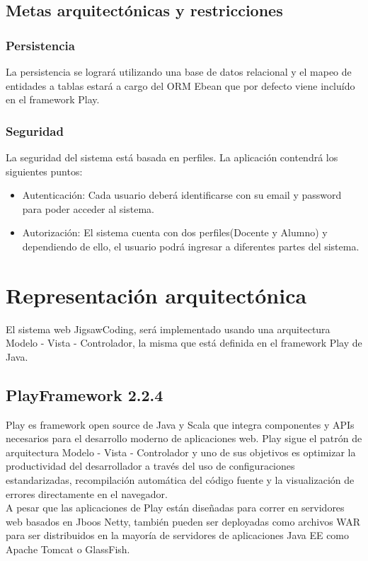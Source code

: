 \subsection{Metas arquitectónicas y restricciones}
\subsubsection{Persistencia}
La persistencia se logrará utilizando una base de datos relacional y el mapeo de entidades a tablas estará a cargo del ORM Ebean que por defecto viene incluído en el framework Play.

\subsubsection{Seguridad}
La seguridad del sistema está basada en perfiles. La aplicación contendrá los siguientes puntos:

\begin{itemize}
	\item Autenticación: Cada usuario deberá identificarse con su email y password para poder acceder al sistema.
	\item Autorización: El sistema cuenta con dos perfiles(Docente y Alumno) y dependiendo de ello, el usuario podrá ingresar a diferentes partes del sistema.
\end{itemize}

\section{Representación arquitectónica}
El sistema web JigsawCoding, será implementado usando una arquitectura Modelo - Vista - Controlador, la misma que está definida en el framework Play de Java.
\subsection{PlayFramework 2.2.4}
Play es framework open source de Java y Scala que integra componentes y APIs necesarios para el desarrollo moderno de aplicaciones web. Play sigue el patrón de arquitectura Modelo - Vista - Controlador y uno de sus objetivos es optimizar la productividad del desarrollador a través del uso de configuraciones estandarizadas, recompilación automática del código fuente y la visualización de errores directamente en el navegador.\\

A pesar que las aplicaciones de Play están diseñadas para correr en servidores web basados en Jboos Netty, también pueden ser deployadas como archivos WAR para ser distribuidos en la mayoría de servidores de aplicaciones Java EE como Apache Tomcat o GlassFish.

